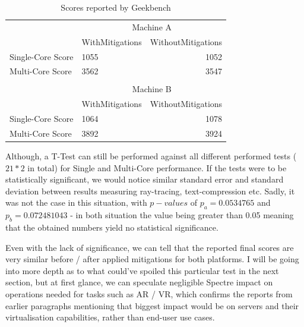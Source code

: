 \documentclass{csfourzero}
\begin{document}
\begin{table}[h]
\centering
\begin{tabular}{llr}
\cline{2-3}
\multicolumn{1}{c|}{}                   & \multicolumn{2}{c|}{Machine A}                                                 \\ \cline{2-3} 
\multicolumn{1}{l|}{}                   & \multicolumn{1}{l|}{WithMitigations} & \multicolumn{1}{r|}{WithoutMitigations} \\ \hline
\multicolumn{1}{|l|}{Single-Core Score} & \multicolumn{1}{l|}{1055}            & \multicolumn{1}{r|}{1052}               \\ \hline
\multicolumn{1}{|l|}{Multi-Core Score}  & \multicolumn{1}{l|}{3562}            & \multicolumn{1}{r|}{3547}               \\ \hline
                                        &                                      & \multicolumn{1}{l}{}                    \\ \cline{2-3} 
\multicolumn{1}{l|}{}                   & \multicolumn{2}{c|}{Machine B}                                                 \\ \cline{2-3} 
\multicolumn{1}{l|}{}                   & \multicolumn{1}{l|}{WithMitigations} & \multicolumn{1}{r|}{WithoutMitigations} \\ \hline
\multicolumn{1}{|l|}{Single-Core Score} & \multicolumn{1}{l|}{1064}            & \multicolumn{1}{r|}{1078}               \\ \hline
\multicolumn{1}{|l|}{Multi-Core Score}  & \multicolumn{1}{l|}{3892}            & \multicolumn{1}{r|}{3924}               \\ \hline
\end{tabular}
\caption{Scores reported by Geekbench}
\label{tab:geekbench}
\end{table}

Although, a T-Test can still be performed against all different performed tests ($21 * 2$ in total) for Single and Multi-Core performance. If the tests were to be statistically significant, we would notice similar standard error and standard deviation between results measuring ray-tracing, text-compression etc. Sadly, it was not the case in this situation, with $p-values$ of $p_{a} = 0.0534765$ and $p_{b} = 0.072481043$ - in both situation the value being greater than 0.05 meaning that the obtained numbers yield no statistical significance.

Even with the lack of significance, we can tell that the reported final scores are very similar before / after applied mitigations for both platforms. I will be going into more depth as to what could've spoiled this particular test in the next section, but at first glance, we can speculate negligible Spectre impact on operations needed for tasks such as AR / VR, which confirms the reports from earlier paragraphs mentioning that biggest impact would be on servers and their virtualisation capabilities, rather than end-user use cases.
\end{document}
